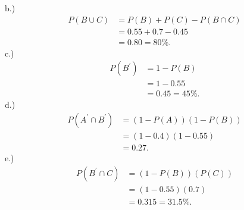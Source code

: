 \documentclass{report}
\begin{document}
    \bigbreak \noindent 
    b.) 
    \begin{align*} 
        P(B \cup C) &= P(B) + P(C) - P(B \cap C) \\
                    &= 0.55 + 0.7 -  0.45\\
                    &=0.80 = 80\%
    .\end{align*}
    \bigbreak \noindent 
    c.) 
    \begin{align*}
        P(B^{\prime}) &= 1-P(B) \\
        &=1-0.55  \\
        &=0.45 =45\%
    .\end{align*}
    \bigbreak \noindent 
    d.)
    \begin{align*}
        P(A^{\prime} \cap B^{\prime})  &= (1-P(A))(1-P(B)) \\
      &=(1-0.4)(1-0.55) \\
      &=0.27
    .\end{align*}
    \bigbreak \noindent 
    e.)
    \begin{align*}
        P(B^{\prime} \cap C) &= (1-P(B))(P(C)) \\
                             &= (1-0.55)(0.7) \\
                             &=0.315 = 31.5\%
    .\end{align*}

 
\end{document}
